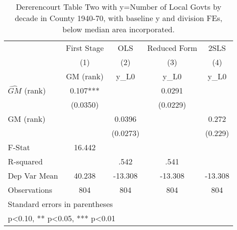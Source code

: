 \begin{table}[htbp]\centering
\def\sym#1{\ifmmode^{#1}\else\(^{#1}\)\fi}
\caption{Dererencourt Table Two with y=Number of Local Govts by decade in County 1940-70, with baseline y and division FEs, below median area incorporated.}
\begin{tabular}{l*{4}{c}}
\toprule
                    & First Stage   &         OLS   &Reduced Form   &        2SLS   \\
                    &\multicolumn{1}{c}{(1)}&\multicolumn{1}{c}{(2)}&\multicolumn{1}{c}{(3)}&\multicolumn{1}{c}{(4)}\\
                    &\multicolumn{1}{c}{GM  (rank)}&\multicolumn{1}{c}{y\_L0}&\multicolumn{1}{c}{y\_L0}&\multicolumn{1}{c}{y\_L0}\\
\midrule
$\hat{GM}$ (rank)   &       0.107***&               &      0.0291   &               \\
                    &    (0.0350)   &               &    (0.0229)   &               \\
\addlinespace
GM  (rank)          &               &      0.0396   &               &       0.272   \\
                    &               &    (0.0273)   &               &     (0.229)   \\
\midrule
F-Stat              &      16.442   &               &               &               \\
R-squared           &               &        .542   &        .541   &               \\
Dep Var Mean        &      40.238   &     -13.308   &     -13.308   &     -13.308   \\
Observations        &         804   &         804   &         804   &         804   \\
\bottomrule
\multicolumn{5}{l}{\footnotesize Standard errors in parentheses}\\
\multicolumn{5}{l}{\footnotesize * p<0.10, ** p<0.05, *** p<0.01}\\
\end{tabular}
\end{table}

